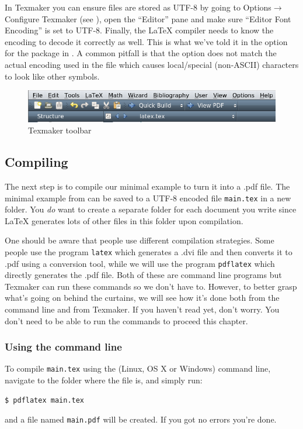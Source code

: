 In Texmaker you can ensure files are stored as UTF-8 by going to Options$\rightarrow$ Configure Texmaker (see ), open the ``Editor'' pane and make sure ``Editor Font Encoding'' is set to UTF-8. Finally, the \LaTeX{} compiler needs to know the encoding to decode it correctly as well. This is what we've told it in the option for the  package in . A common pitfall is that the  option does not match the actual encoding used in the file which causes local/special (non-ASCII) characters to look like other symbols.

\begin{figure}
	\centering
	\includegraphics[width=\textwidth]{graphics/texmaker.png}
	\caption{Texmaker toolbar}
	\label{fig:latex:texmaker}
\end{figure}

\subsection{Compiling}
The next step is to compile our minimal example to turn it into a .pdf file. The minimal example from  can be saved to a UTF-8 encoded file \texttt{main.tex} in a new folder. You \emph{do} want to create a separate folder for each document you write since \LaTeX{} generates lots of other files in this folder upon compilation.

One should be aware that people use different compilation strategies. Some people use the program \texttt{latex} which generates a .dvi file and then converts it to .pdf using a conversion tool, while we will use the program \texttt{pdflatex} which directly generates the .pdf file. Both of these are command line programs but Texmaker can run these commands so we don't have to. However, to better grasp what's going on behind the curtains, we will see how it's done both from the command line and from Texmaker. If you haven't read  yet, don't worry. You don't need to be able to run the commands to proceed this chapter.

\subsubsection{Using the command line}
To compile \texttt{main.tex} using the (Linux, OS X or Windows) command line, navigate to the folder where the file is, and simply run:
\begin{verbatim}
$ pdflatex main.tex
\end{verbatim}
and a file named \verb|main.pdf| will be created. If you got no errors you're done.

